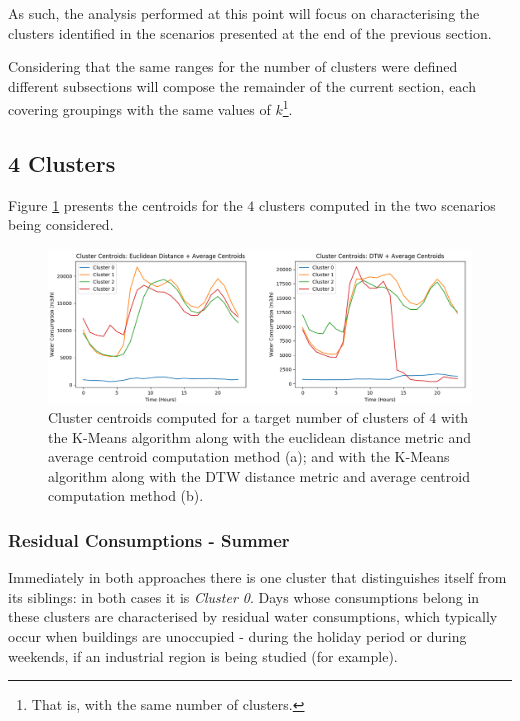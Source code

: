 \documentclass[9pt,journal,compsoc]{IEEEtran}
\begin{document}
As such, the analysis performed at this point will focus on characterising the clusters identified in the scenarios presented at the end of the previous section.

Considering that the same ranges for the number of clusters were defined different subsections will compose the remainder of the current section, each covering groupings with the same values of $k$\footnote{That is, with the same number of clusters.}.

\subsection{4 Clusters}

Figure \ref{centroids_4clusters} presents the centroids for the $4$ clusters computed in the two scenarios being considered.

\begin{figure}
	\centering
	\includegraphics[scale=0.4]{images/centroids_4_clusters.png}
	\caption{Cluster centroids computed for a target number of clusters of $4$ with the K-Means algorithm along with the euclidean distance metric and average centroid computation method (a); and with the K-Means algorithm along with the DTW distance metric and average centroid computation method (b).}
	\label{centroids_4clusters}
\end{figure}

\subsubsection{Residual Consumptions - Summer}
\label{residual_consumptions}

Immediately in both approaches there is one cluster that distinguishes itself from its siblings: in both cases it is \emph{Cluster 0}. Days whose consumptions belong in these clusters are characterised by residual water consumptions, which typically occur when buildings are unoccupied - during the holiday period or during weekends, if an industrial region is being studied (for example).
\end{document}
